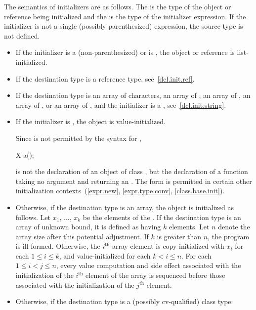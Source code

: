 \pnum
The semantics of initializers are as follows.
The
%
is the type of the object or reference being initialized and the
is the type of the initializer expression.
If the initializer is not a single (possibly parenthesized) expression, the
source type is not defined.
\begin{itemize}
\item
If the initializer is a (non-parenthesized) 
or is \tcode{=} , the object or reference
is list-initialized.
\item
If the destination type is a reference type, see~\ref{dcl.init.ref}.
\item
If the destination type is an array of characters,
an array of ,
an array of ,
an array of ,
or an array of
,
and the initializer is a , see~\ref{dcl.init.string}.
\item If the initializer is \tcode{()}, the object is value-initialized.
%
\begin{note}
Since
\tcode{()}
is not permitted by the syntax for
,
\begin{codeblock}
X a();
\end{codeblock}
is not the declaration of an object of class
,
but the declaration of a function taking no argument and returning an
.
The form
\tcode{()}
is permitted in certain other initialization contexts~(\ref{expr.new},
\ref{expr.type.conv}, \ref{class.base.init}).
\end{note}

\item
Otherwise, if the destination type is an array,
the object is initialized as follows.
Let $x_1$, $\dotsc$, $x_k$ be
the elements of the .
If the destination type is an array of unknown bound,
it is defined as having $k$ elements.
Let $n$ denote the array size after this potential adjustment.
If $k$ is greater than $n$,
the program is ill-formed.
Otherwise, the $i^\text{th}$ array element is copy-initialized with
$x_i$ for each $1 \leq i \leq k$, and
value-initialized for each $k < i \leq n$.
For each $1 \leq i < j \leq n$,
every value computation and side effect associated with
the initialization of the $i^\text{th}$ element of the array
is sequenced before those associated with
the initialization of the $j^\text{th}$ element.
\item
Otherwise, if the destination type is a (possibly cv-qualified) class type:


\end{itemize}

